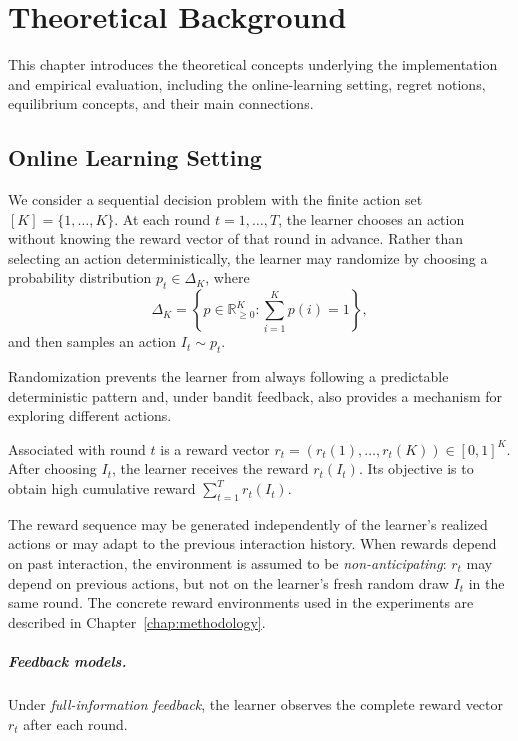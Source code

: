 \chapter{Theoretical Background}
\label{chap:background}

This chapter introduces the theoretical concepts underlying the
implementation and empirical evaluation, including the online-learning
setting, regret notions, equilibrium concepts, and their main connections.


\section{Online Learning Setting}
\label{sec:online-learning-setting}

We consider a sequential decision problem with the finite action set
\([K]=\{1,\ldots,K\}\). At each round \(t=1,\ldots,T\), the learner chooses
an action without knowing the reward vector of that round in advance. Rather
than selecting an action deterministically, the learner may randomize by
choosing a probability distribution \(p_t\in\Delta_K\), where
\[
    \Delta_K
    =
    \left\{
        p\in\mathbb{R}_{\geq0}^{K} :
        \sum_{i=1}^{K}p(i)=1
    \right\},
\]
and then samples an action \(I_t\sim p_t\).

Randomization prevents the learner from always following a predictable
deterministic pattern and, under bandit feedback, also provides a mechanism
for exploring different actions.

Associated with round \(t\) is a reward vector
\(r_t=(r_t(1),\ldots,r_t(K))\in[0,1]^K\). After choosing \(I_t\), the learner
receives the reward \(r_t(I_t)\). Its objective is to obtain high cumulative
reward \(\sum_{t=1}^{T}r_t(I_t)\).

The reward sequence may be generated independently of the learner's realized
actions or may adapt to the previous interaction history. When rewards depend
on past interaction, the environment is assumed to be
\emph{non-anticipating}: \(r_t\) may depend on previous actions, but not on
the learner's fresh random draw \(I_t\) in the same round. The concrete reward
environments used in the experiments are described in
Chapter~\ref{chap:methodology}.

\paragraph{Feedback models.}
Under \emph{full-information feedback}, the learner observes the complete
reward vector \(r_t\) after each round.

